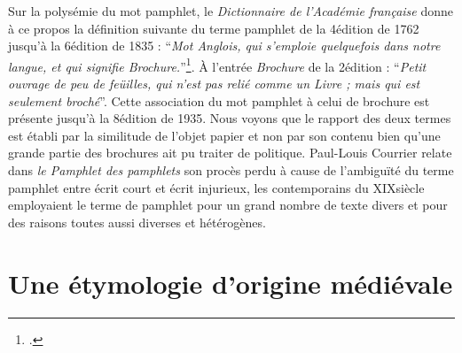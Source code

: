 Sur la polysémie du mot pamphlet, le \textit{Dictionnaire de l'Académie française} donne à ce propos la définition suivante du terme pamphlet de la 4\ieme  édition de 1762 jusqu'à la 6\ieme  édition de 1835 : \enquote{\textit{Mot Anglois, qui s'emploie quelquefois dans notre langue, et qui signifie Brochure.}}\footcites{francaise_dictionnaire_nodate}. À l'entrée \textit{Brochure} de la 2\ieme  édition : \enquote{\textit{Petit ouvrage de peu de feüilles, qui n'est pas relié comme un Livre ; mais qui est seulement broché}}. Cette association du mot pamphlet à celui de brochure est présente jusqu'à la 8\ieme édition de 1935. Nous voyons que le rapport des deux termes est établi par la similitude de l'objet papier et non par son contenu bien qu'une grande partie des brochures ait pu traiter de politique. Paul-Louis Courrier relate dans \textit{le Pamphlet des pamphlets} son procès perdu à cause de l'ambiguïté du terme pamphlet entre écrit court et écrit injurieux, les contemporains du XIX\ieme siècle employaient le terme de pamphlet pour un grand nombre de texte divers et pour des raisons toutes aussi diverses et hétérogènes. 

\section{Une étymologie d'origine médiévale}

